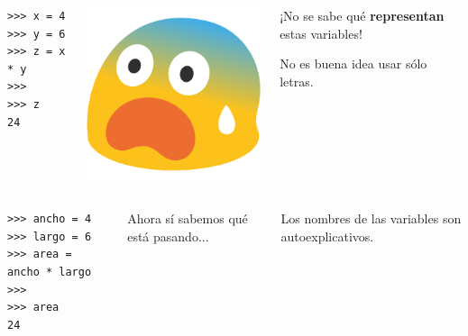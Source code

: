 \vspace{-2ex}
\begin{columns}[onlytextwidth,t]

\begin{lstlisting}
>>> x = 4
>>> y = 6
>>> z = x * y
>>>
>>> z
24
\end{lstlisting}

\pause
\vspace{1ex}
\includegraphics[width=.7\textwidth,valign=t]{img/658-emoji_android_fearful_face.png}

\begin{footnotesize}
    \begin{nzalertblock}
    ¡No se sabe qué \textbf{representan} estas variables!
    \end{nzalertblock}

    \begin{nzalertblock}
    \footnotesize No es buena idea usar sólo letras.
    \end{nzalertblock}
\end{footnotesize}
\end{columns}


\pause
\vspace{2ex}

\begin{columns}[onlytextwidth,t]
\begin{lstlisting}
>>> ancho = 4
>>> largo = 6
>>> area = ancho * largo
>>>
>>> area
24
\end{lstlisting}
\pause

\bgnblocknormal
    Ahora sí sabemos qué está pasando...
\trmblocknormal

\bgnblocknormal
    \footnotesize Los nombres de las variables son autoexplicativos.
\trmblocknormal

\end{columns}

